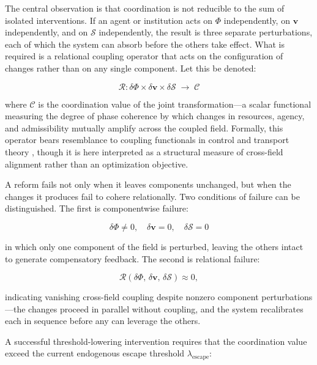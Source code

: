 \documentclass[11pt, a4paper]{article}
\begin{document}
The central observation is that coordination is not reducible to the sum of isolated interventions. If an agent or institution acts on $\Phi$ independently, on $\mathbf{v}$ independently, and on $\mathcal{S}$ independently, the result is three separate perturbations, each of which the system can absorb before the others take effect. What is required is a relational coupling operator that acts on the configuration of changes rather than on any single component. Let this be denoted:

\begin{equation}
\mathcal{R} : \delta\Phi \times \delta\mathbf{v} \times \delta\mathcal{S} \;\longrightarrow\; \mathcal{C}
\end{equation}

where $\mathcal{C}$ is the coordination value of the joint transformation---a scalar functional measuring the degree of phase coherence by which changes in resources, agency, and admissibility mutually amplify across the coupled field. Formally, this operator bears resemblance to coupling functionals in control and transport theory \cite{villani2009,lasry2007}, though it is here interpreted as a structural measure of cross-field alignment rather than an optimization objective.

A reform fails not only when it leaves components unchanged, but when the changes it produces fail to cohere relationally. Two conditions of failure can be distinguished. The first is componentwise failure:

\begin{equation}
\delta\Phi \neq 0, \quad \delta\mathbf{v} = 0, \quad \delta\mathcal{S} = 0
\end{equation}

in which only one component of the field is perturbed, leaving the others intact to generate compensatory feedback. The second is relational failure:

\begin{equation}
\mathcal{R}(\delta\Phi,\, \delta\mathbf{v},\, \delta\mathcal{S}) \approx 0,
\end{equation}

indicating vanishing cross-field coupling despite nonzero component perturbations---the changes proceed in parallel without coupling, and the system recalibrates each in sequence before any can leverage the others.

A successful threshold-lowering intervention requires that the coordination value exceed the current endogenous escape threshold $\lambda_{\mathrm{escape}}$:
\end{document}
